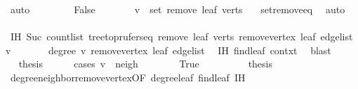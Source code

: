 \begin{isabellebody}
\ auto\isanewline
\ \ \isamarkupfalse%
\isanewline
\ \ \ \ \isamarkupfalse%
\ False\isanewline
\ \ \ \ \isamarkupfalse%
\ \isamarkupfalse%
\ {\isachardoublequoteopen}v\ {\isasymin}\ set\ {\isacharparenleft}{\kern0pt}remove{}\ leaf\ verts{\isacharparenright}{\kern0pt}{\isachardoublequoteclose}\ \isamarkupfalse%
\ {}\ set{\isacharunderscore}{\kern0pt}remove{}{\isacharunderscore}{\kern0pt}eq\ \isamarkupfalse%
\ auto\isanewline
\ \ \ \ \isamarkupfalse%
\ \isamarkupfalse%
\ IH{\isacharcolon}{\kern0pt}\ {\isachardoublequoteopen}Suc\ {\isacharparenleft}{\kern0pt}count{\isacharunderscore}{\kern0pt}list\ {\isacharparenleft}{\kern0pt}tree{\isacharunderscore}{\kern0pt}to{\isacharunderscore}{\kern0pt}prufer{\isacharunderscore}{\kern0pt}seq\ {\isacharparenleft}{\kern0pt}remove{}\ leaf\ verts{\isacharparenright}{\kern0pt}\ {\isacharparenleft}{\kern0pt}remove{\isacharunderscore}{\kern0pt}vertex\ leaf\ {\isacharquery}{\kern0pt}edge{\isacharunderscore}{\kern0pt}list{\isacharparenright}{\kern0pt}{\isacharparenright}{\kern0pt}\ v{\isacharparenright}{\kern0pt}\isanewline
\ \ \ \ \ \ {\isacharequal}{\kern0pt}\ degree\ v\ {\isacharparenleft}{\kern0pt}remove{\isacharunderscore}{\kern0pt}vertex\ leaf\ {\isacharquery}{\kern0pt}edge{\isacharunderscore}{\kern0pt}list{\isacharparenright}{\kern0pt}{\isachardoublequoteclose}\ \isamarkupfalse%
\ {\isachardoublequoteopen}{}{\isachardot}{\kern0pt}IH{\isachardoublequoteclose}\ find{\isacharunderscore}{\kern0pt}leaf\ contxt{\isacharprime}{\kern0pt}\ \isamarkupfalse%
\ blast\isanewline
\ \ \ \ \isamarkupfalse%
\ \isamarkupfalse%
\ {\isacharquery}{\kern0pt}thesis\isanewline
\ \ \ \ \isamarkupfalse%
\ {\isacharparenleft}{\kern0pt}cases\ {\isachardoublequoteopen}v\ {\isacharequal}{\kern0pt}\ {\isacharquery}{\kern0pt}neigh{\isachardoublequoteclose}{\isacharparenright}{\kern0pt}\isanewline
\ \ \ \ \ \ \isamarkupfalse%
\ True\isanewline
\ \ \ \ \ \ \isamarkupfalse%
\ \isamarkupfalse%
\ {\isacharquery}{\kern0pt}thesis\ \isamarkupfalse%
\ degree{\isacharunderscore}{\kern0pt}neighbor{\isacharunderscore}{\kern0pt}remove{\isacharunderscore}{\kern0pt}vertex{\isacharbrackleft}{\kern0pt}OF\ degree{\isacharunderscore}{\kern0pt}leaf{\isacharbrackright}{\kern0pt}\ find{\isacharunderscore}{\kern0pt}leaf\ IH\ \isamarkupfalse%

\end{isabellebody}
